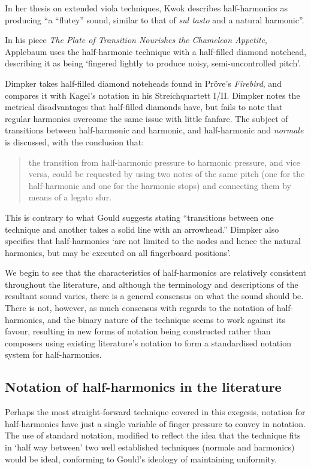 In her thesis on extended viola techniques, Kwok describes half-harmonics as producing ``a “flutey” sound, similar to that of \emph{sul tasto} and a natural harmonic''.\autocite[]{kwokBreakingSoundBarriers2018}

In his piece \emph{The Plate of Transition Nourishes the Chameleon Appetite}, Applebaum uses the half-harmonic technique with a half-filled diamond notehead, describing it as being `fingered lightly to produce noisy, semi-uncontrolled pitch'.\autocite[]{applebaumPlateTransitionNourishes1992}

Dimpker takes half-filled diamond noteheads found in Pröve's \emph{Firebird}, and compares it with Kagel's notation in his Streichquartett I/II.\autocite[120--121]{dimpkerExtendedNotationDepiction2012}
Dimpker notes the metrical disadvantages that half-filled diamonds have, but fails to note that regular harmonics overcome the same issue with little fanfare.
The subject of transitions between half-harmonic and harmonic, and half-harmonic and \emph{normale} is discussed, with the conclusion that:
\begin{quotation}
  the transition from half-harmonic pressure to harmonic pressure, and vice versa, could be requested by using two notes of the same pitch (one for the half-harmonic and one for the harmonic stops) and connecting them by means of a legato slur.\autocite[121]{dimpkerExtendedNotationDepiction2012}
\end{quotation}
This is contrary to what Gould suggests stating ``transitions between one technique and another takes a solid line with an arrowhead.''\autocite[493]{gouldBars2011}
Dimpker also specifies that half-harmonics `are not limited to the nodes and hence the natural harmonics, but may be executed on all fingerboard positions'.\autocite[121]{dimpkerExtendedNotationDepiction2012}

We begin to see that the characteristics of half-harmonics are relatively consistent throughout the literature, and although the terminology and descriptions of the resultant sound varies, there is a general consensus on what the sound should be.
There is not, however, as much consensus with regards to the notation of half-harmonics, and the binary nature of the technique seems to work against its favour, resulting in new forms of notation being constructed rather than composers using existing literature's notation to form a standardised notation system for half-harmonics.
\subsection{Notation of half-harmonics in the literature}
Perhaps the most straight-forward technique covered in this exegesis, notation for half-harmonics have just a single variable of finger pressure to convey in notation.
The use of standard notation, modified to reflect the idea that the technique fits in `half way between' two well established techniques (normale and harmonics) would be ideal, conforming to Gould's ideology of maintaining uniformity.




